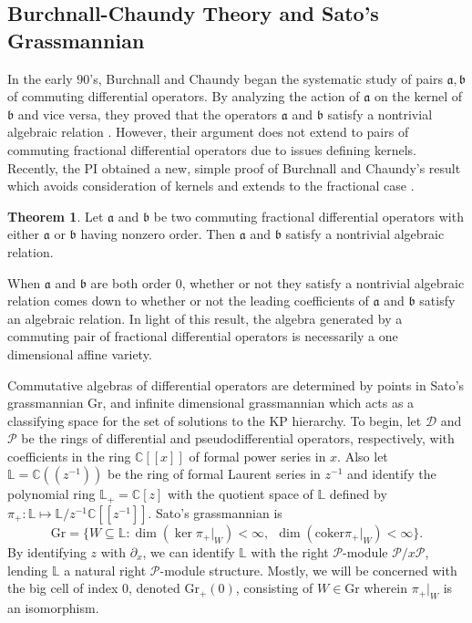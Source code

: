 \documentclass[11pt,letterpaper]{article}
\theoremstyle{definition}
\newtheorem{thm}{Theorem}
\newcommand{\bbc}{\mathbb{C}}
\newcommand{\Gr}{\text{Gr}}
\newcommand{\coker}{\text{coker}}
\begin{document}
\subsection{Burchnall-Chaundy Theory and Sato's Grassmannian}
In the early $90$'s, Burchnall and Chaundy began the systematic study of pairs $\mathfrak a,\mathfrak b$ of commuting differential operators.
By analyzing the action of $\mathfrak a$ on the kernel of $\mathfrak b$ and vice versa, they proved that the operators $\mathfrak a$ and $\mathfrak b$ satisfy a nontrivial algebraic relation \cite{burchnall}.
However, their argument does not extend to pairs of commuting fractional differential operators due to issues defining kernels.
Recently, the PI obtained a new, simple proof of Burchnall and Chaundy's result which avoids consideration of kernels and extends to the fractional case \cite{CHIY}.
\begin{thm}
Let $\mathfrak a$ and $\mathfrak b$ be two commuting fractional differential operators with either $\mathfrak a$ or $\mathfrak b$ having nonzero order.  Then $\mathfrak a$ and $\mathfrak b$ satisfy a nontrivial algebraic relation.
\end{thm}
When $\mathfrak a$ and $\mathfrak b$ are both order $0$, whether or not they satisfy a nontrivial algebraic relation comes down to whether or not the leading coefficients of $\mathfrak a$ and $\mathfrak b$ satisfy an algebraic relation.
In light of this result, the algebra generated by a commuting pair of fractional differential operators is necessarily a one dimensional affine variety.

Commutative algebras of differential operators are determined by points in Sato's grassmannian $\Gr$, and infinite dimensional grassmannian which acts as a classifying space for the set of solutions to the KP hierarchy.
To begin, let $\mathcal D$ and $\mathcal P$ be the rings of differential and pseudodifferential operators, respectively, with coefficients in the ring $\bbc[[x]]$ of formal power series in $x$.  Also let $\mathbb L = \bbc((z^{-1}))$ be the ring of formal Laurent series in $z^{-1}$ and identify the polynomial ring $\mathbb L_+ =\bbc[z]$ with the quotient space of $\mathbb L$ defined by $\pi_+: \mathbb L\mapsto \mathbb L/z^{-1}\bbc[[z^{-1}]]$.
Sato's grassmannian is
$$\Gr = \{W\subseteq \mathbb L: \dim(\ker\pi_+|_W) <\infty,\ \ \dim(\coker\pi_+|_W)<\infty\}.$$
By identifying $z$ with $\partial_x$, we can identify $\mathbb L$ with the right $\mathcal P$-module $\mathcal P/x\mathcal P$, lending $\mathbb L$ a natural right $\mathcal P$-module structure.
Mostly, we will be concerned with the big cell of index $0$, denoted $\Gr_+(0)$, consisting of $W\in\Gr$ wherein $\pi_+|_W$ is an isomorphism.
\end{document}
